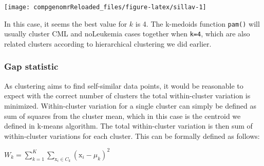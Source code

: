 \documentclass[12pt,]{krantz}
\newenvironment{Shaded}{\begin{snugshade}}{\end{snugshade}}
\newcommand{\ControlFlowTok}[1]{\textcolor[rgb]{0.13,0.29,0.53}{\textbf{#1}}}
\newcommand{\DataTypeTok}[1]{\textcolor[rgb]{0.13,0.29,0.53}{#1}}
\newcommand{\DecValTok}[1]{\textcolor[rgb]{0.00,0.00,0.81}{#1}}
\newcommand{\KeywordTok}[1]{\textcolor[rgb]{0.13,0.29,0.53}{\textbf{#1}}}
\newcommand{\NormalTok}[1]{#1}
\newcommand{\OperatorTok}[1]{\textcolor[rgb]{0.81,0.36,0.00}{\textbf{#1}}}
\newcommand{\StringTok}[1]{\textcolor[rgb]{0.31,0.60,0.02}{#1}}
\begin{document}
\begin{Shaded}
\end{Shaded}

\begin{center}\texttt{[image: compgenomrReloaded\_files/figure-latex/sillav-1]} \end{center}

In this case, it seems the best value for \(k\) is 4. The k-medoids function \texttt{pam()} will usually cluster CML and noLeukemia cases together when \texttt{k=4}, which are also related clusters according to hierarchical clustering we did earlier.

\hypertarget{gap-statistic}{%
\subsubsection{Gap statistic}\label{gap-statistic}}

As clustering aims to find self-similar data points, it would be reasonable to expect with the correct number of clusters the total within-cluster variation is minimized. Within-cluster variation for a single cluster can simply be defined as sum of squares from the cluster mean, which in this case is the centroid we defined in k-means algorithm. The total within-cluster variation is then sum of within-cluster variations for each cluster. This can be formally defined as follows:

\(\displaystyle W_k = \sum_{k=1}^K \sum_{\mathrm{x}_i \in C_k} (\mathrm{x}_i - \mu_k )^2\)
\end{document}
